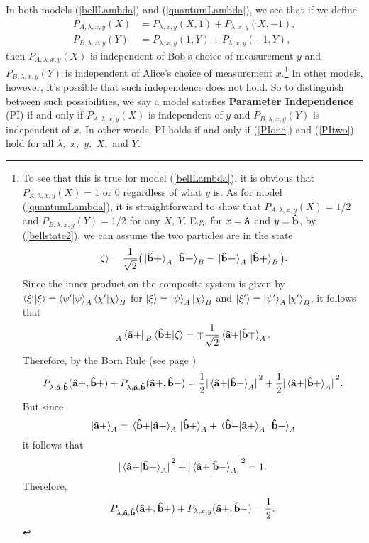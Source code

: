 In both models (\ref{bellLambda}) and (\ref{quantumLambda}), we see that if we define
\begin{align}
P_{A, \lambda,x,y}(X)&=P_{\lambda,x,y}(X, 1)+P_{\lambda,x,y}(X, -1),\label{PIone}\\
P_{B, \lambda,x,y}(Y)&=P_{\lambda,x,y}(1, Y)+P_{\lambda,x,y}(-1, Y),\label{PItwo}
\end{align}
then $P_{A,\lambda,x,y}(X)$ is independent of Bob's choice of measurement $y$ and $P_{B,\lambda,x,y}(Y)$ is independent of Alice's choice of measurement $x$.\footnote{To see that this is true for model (\ref{bellLambda}), it is obvious that $P_{A, \lambda,x,y}(X)=1$ or 0 regardless of what $y$ is. As for model (\ref{quantumLambda}), it is straightforward to show\label{onehalf} that $P_{A, \lambda,x,y}(X)=1/2$ and $P_{B,\lambda,x,y}(Y)=1/2$ for any $X,\, Y$. E.g. for $x=\vb{\hat{a}}$ and $y=\vb{\hat{b}}$, by (\ref{bellstate2}), we can assume the two particles are in the state 
$$\ket{\zeta}=\frac{1}{\sqrt{2}}\big(\ket*{\vb{\hat{{b}}}\bm{+}}_A\ket*{\vb{\hat{{b}}}\bm{-}}_B-\ket*{\vb{\hat{{b}}}\bm{-}}_A\ket*{\vb{\hat{{b}}}\bm{+}}_B\big).$$
Since the inner product on the composite system is given by  $\ip{\xi'}{\xi}=\ip{\psi'}{\psi}_A\ip{\chi'}{\chi}_B$ for $\ket{\xi}=\ket{\psi}_A\ket{\chi}_B$ and $\ket{\xi'}=\ket{\psi'}_A\ket{\chi'}_B$, it follows that 
$$\prescript{}{A}{ \bra*{\vb{\hat{a}+}}}\prescript{}{B}{\ip*{\vb{\hat{b}\pm}}{\zeta}}=\mp\frac{1}{\sqrt{2}}\ip*{\vb{\hat{a}+}}{\vb{\hat{b}\mp}}_A.$$ 
Therefore, by the Born Rule (see page \pageref{bornrule})
$$P_{\lambda,\vb{\hat{a}},\vb{\hat{b}}}(\vb{\hat{a}+}, \vb{\hat{b}+})+P_{\lambda,\vb{\hat{a}},\vb{\hat{b}}}(\vb{\hat{a}+}, \vb{\hat{b}-})=\frac{1}{2}\abs*{\ip*{\vb{\hat{a}+}}{\vb{\hat{b}-}}_A}^2+\frac{1}{2}\abs*{\ip*{\vb{\hat{a}+}}{\vb{\hat{b}+}}_A}^2.$$
But since
$$\ket*{\vb{\hat{a}+}}_A=\ip*{\vb{\hat{b}+}}{\vb{\hat{a}+}}_A\ket*{\vb{\hat{b}+}}_A+\ip*{\vb{\hat{b}-}}{\vb{\hat{a}+}}_A\ket*{\vb{\hat{b}-}}_A$$
it follows that 
$$\abs*{\ip*{\vb{\hat{a}+}}{\vb{\hat{b}+}}_A}^2+\abs*{\ip*{\vb{\hat{a}+}}{\vb{\hat{b}-}}_A}^2 =1. $$
Therefore, 
$$P_{\lambda,\vb{\hat{a}},\vb{\hat{b}}}(\vb{\hat{a}+}, \vb{\hat{b}+})+P_{\lambda,x,y}(\vb{\hat{a}+}, \vb{\hat{b}-})=\frac{1}{2}.$$
 } In other models, however, it's possible that such independence does not hold. So to distinguish between such possibilities, we say a model satisfies \textbf{Parameter Independence} (PI) if and only if $P_{A,\lambda,x,y}(X)$ is independent of $y$ and $P_{B,\lambda,x,y}(Y)$ is independent of $x$. In other words, PI holds if and only if (\ref{PIone}) and (\ref{PItwo}) hold for all $\lambda,$ $x,$ $y,$ $X,$ and $Y$.

